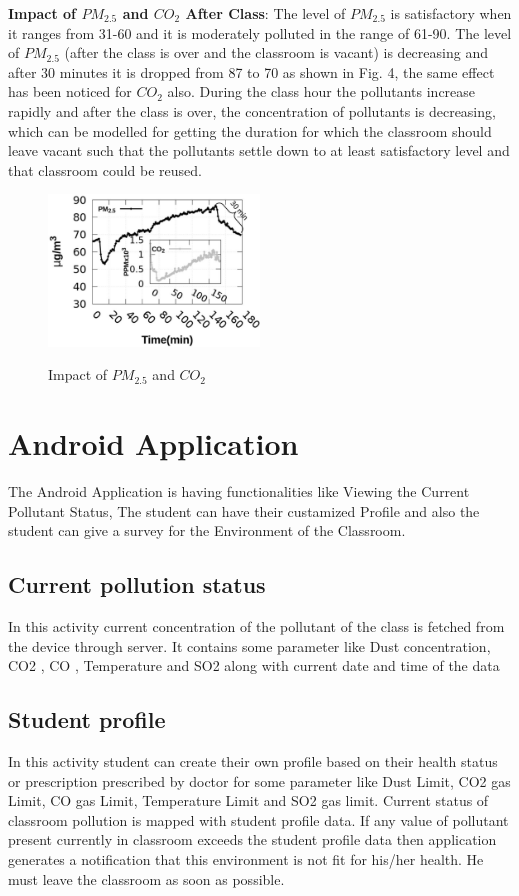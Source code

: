 \textbf{Impact of $PM_{2.5}$ and $CO_2$ After Class}: The level of $PM_{2.5}$ is satisfactory when it ranges from 31-60 and it is moderately polluted in the range of 61-90. The level of $PM_{2.5}$ (after the class is over and the classroom is vacant) is decreasing and after 30 minutes it is dropped from 87 to 70 as shown in Fig. 4, the same effect has been noticed for $CO_2$ also. During the class hour the pollutants increase rapidly and after the class is over, the concentration of pollutants is decreasing, which can be modelled for getting the duration for which the classroom should leave vacant such that the pollutants settle down to at least satisfactory level and that classroom could be reused.
\begin{figure}
\centering
\includegraphics[width=0.5\textwidth]{./Presentation3}\\[0.1in]
\label{fig:Impact of $PM_{2.5}$ and $CO_2$}
\caption{Impact of $PM_{2.5}$ and $CO_2$}
\end{figure}

\section{Android Application}

The Android Application is having functionalities like Viewing the Current Pollutant Status, The student can have their custamized Profile and also the student can give a survey for the Environment of the Classroom.

\subsection{Current pollution status}
In this activity current concentration of the pollutant of the class is fetched from the device through server. It contains some parameter like Dust concentration, CO2 , CO , Temperature and SO2 along with current date and time of the data



\subsection{Student profile}
In this activity student can create their own profile based on their health status or prescription prescribed by doctor for some parameter like Dust Limit, CO2 gas Limit, CO gas Limit, Temperature Limit and SO2 gas limit. Current status of classroom pollution is mapped with student profile data. If any value of pollutant present currently in classroom exceeds the student profile data then application generates a notification that this environment is not fit for his/her health. He must leave the classroom as soon as possible. 

